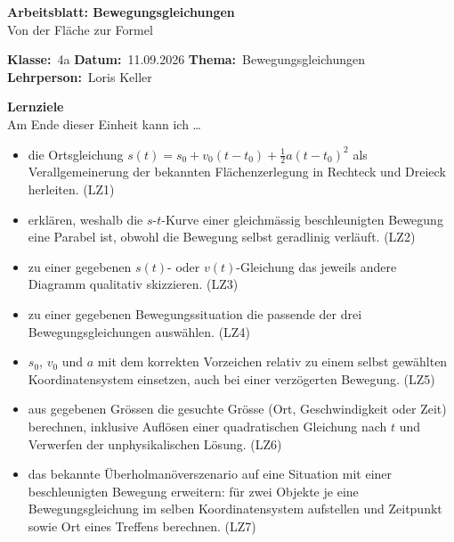 \documentclass[addpoints,11pt,a4paper]{exam}
\newenvironment{infobox}{%
  \par\addvspace{10pt}\noindent
}{%
  \par\addvspace{10pt}
}
\newcommand{\Kopfzeile}[5]{%
  \begin{titlebox}
    {\color{white}\sffamily\bfseries\Large #4}\\[3pt]
    {\color{white}\sffamily\normalsize #5}
  \end{titlebox}
  \vspace{0.5em}
  \noindent\textbf{Klasse:}~#1 \hfill \textbf{Datum:}~#2 \hfill \textbf{Thema:}~#3
    \hfill \textbf{Lehrperson:}~Loris Keller
  \vspace{0.8em}
  \lhead{\textcolor{darkgray}{#3}}
  \rhead{\textcolor{darkgray}{#4}}
}
\newcommand{\Klasse}{4a}
\newcommand{\Datum}{11.09.2026}
\newcommand{\Thema}{Bewegungsgleichungen}
\newcommand{\ArbeitsblattTitel}{Arbeitsblatt: Bewegungsgleichungen}
\newcommand{\ArbeitsblattUntertitel}{Von der Fläche zur Formel}
\begin{document}
\Kopfzeile{\Klasse}{\Datum}{\Thema}{\ArbeitsblattTitel}{\ArbeitsblattUntertitel}

\begin{infobox}
\textbf{Lernziele}\\
Am Ende dieser Einheit kann ich \dots
\begin{itemize}[leftmargin=1.2cm,itemsep=0.25em]
  \item die Ortsgleichung $s(t)=s_0+v_0(t-t_0)+\tfrac{1}{2}a(t-t_0)^2$ als Verallgemeinerung der bekannten Flächenzerlegung in Rechteck und Dreieck herleiten. (LZ1)
  \item erklären, weshalb die $s$-$t$-Kurve einer gleichmässig beschleunigten Bewegung eine Parabel ist, obwohl die Bewegung selbst geradlinig verläuft. (LZ2)
  \item zu einer gegebenen $s(t)$- oder $v(t)$-Gleichung das jeweils andere Diagramm qualitativ skizzieren. (LZ3)
  \item zu einer gegebenen Bewegungssituation die passende der drei Bewegungsgleichungen auswählen. (LZ4)
  \item $s_0$, $v_0$ und $a$ mit dem korrekten Vorzeichen relativ zu einem selbst gewählten Koordinatensystem einsetzen, auch bei einer verzögerten Bewegung. (LZ5)
  \item aus gegebenen Grössen die gesuchte Grösse (Ort, Geschwindigkeit oder Zeit) berechnen, inklusive Auflösen einer quadratischen Gleichung nach $t$ und Verwerfen der unphysikalischen Lösung. (LZ6)
  \item das bekannte Überholmanöverszenario auf eine Situation mit einer beschleunigten Bewegung erweitern: für zwei Objekte je eine Bewegungsgleichung im selben Koordinatensystem aufstellen und Zeitpunkt sowie Ort eines Treffens berechnen. (LZ7)
\end{itemize}
\end{infobox}
\end{document}
